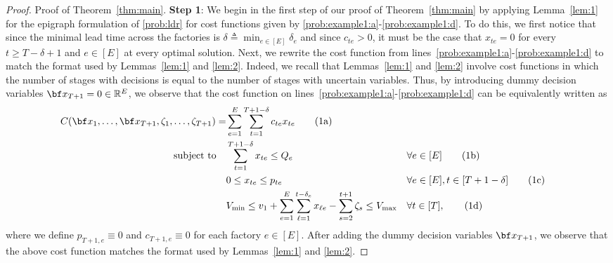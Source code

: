 \documentclass[nonblindrev,mnsc]{informs3} %
\newcommand{\bx}{{\bf x}}
\def\Real{\mathbb{R}}
\let\R\Real
\begin{document}
\begin{APPENDICES}
\begin{proof}{Proof of Theorem~\ref{thm:main}. }
\textbf{Step 1}: 
\noindent  We begin in the first step of our proof of Theorem~\ref{thm:main} by applying Lemma~\ref{lem:1} for the epigraph formulation of \eqref{prob:ldr} for cost functions given by \eqref{prob:example1:a}-\eqref{prob:example1:d}. To do this, we first notice that since the minimal lead time across the factories is $\delta \triangleq\min_{e\in [E]} \delta_e$  and since $c_{te}>0$, it must be the case that $x_{te}=0$ for every $t\ge T-\delta+1$ and $e\in [E]$ at every optimal solution. 
Next, we rewrite the cost function from  lines~\eqref{prob:example1:a}-\eqref{prob:example1:d} to match the format  used by Lemmas~\ref{lem:1} and \ref{lem:2}. Indeed, we recall that Lemmas~\ref{lem:1} and \ref{lem:2} involve cost functions in which the number of stages with decisions is equal to the number of stages with uncertain variables. Thus, by introducing dummy decision variables $\bx_{T+1}=0 \in \R^E$,  we  observe that the cost function on lines~\eqref{prob:example1:a}-\eqref{prob:example1:d} can be equivalently written  as 
\begin{align} 
C(\bx_1,\ldots,\bx_{T+1}, \zeta_1,\ldots,\zeta_{T+1}) =  &  \sum_{e=1}^E \sum_{t=1}^{T+1-\delta}  c_{te} x_{te}\tag{1a} \label{prob:example1:a} \\
\textnormal{subject to}\quad &\sum_{t=1}^{T+1-\delta} x_{te} \le  Q_e &&  \forall e  \in [E] \tag{1b} \label{prob:example1:b}\\
&0 \le x_{te} \le  p_{te} && \forall  e \in [E],  t \in [T +1-\delta] \tag{1c} \label{prob:example1:c}\\
&V_{\textnormal{min}} \le v_1 + \sum_{e=1}^E \sum_{\ell=1}^{t-\delta_e}   x_{\ell e} - \sum_{s=2}^{t+1} \zeta_s \le  V_{\textnormal{max}} && \forall  t \in [T],\tag{1d} \label{prob:example1:d}
\end{align}
where we define $p_{T+1,e}\equiv 0$ and $c_{T+1,e} \equiv 0$ for each factory $e \in [E]$.  After adding the dummy decision variables $\bx_{T+1}$, we observe that the above cost function matches the format used by Lemmas~\ref{lem:1} and \ref{lem:2}.


\end{proof}
\end{APPENDICES}
\end{document}
